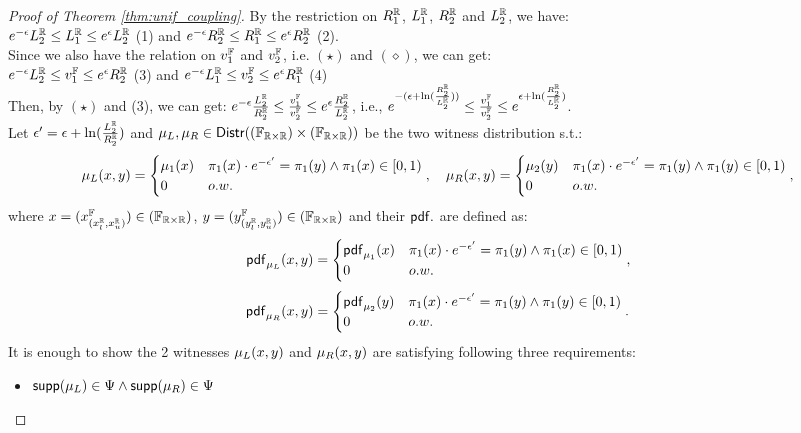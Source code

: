 \documentclass[a4paper,11pt]{article}
\begin{document}
\begin{proof}[Proof of Theorem \ref{thm:unif_coupling}]
%
By the restriction on $R^{\mathbb{R}}_1$, $L^{\mathbb{R}}_1$, $R^{\mathbb{R}}_2$ and $L^{\mathbb{R}}_2$, we have:
\\
$e^{-\epsilon}L^{\mathbb{R}}_2 \leq L^{\mathbb{R}}_1 \leq e^{\epsilon}L^{\mathbb{R}}_2$ (1)
and
$e^{-\epsilon}R^{\mathbb{R}}_2 \leq R^{\mathbb{R}}_1 \leq e^{\epsilon}R^{\mathbb{R}}_2$ (2).
%
\\
Since we also have the relation on $v^{\mathbb{F}}_1$ and $v^{\mathbb{F}}_2$, i.e. $(\star)$ and $(\diamond)$, we can get:
\\
$e^{-\epsilon} L^{\mathbb{R}}_2 \leq v^{\mathbb{F}}_1 \leq e^{\epsilon} R^{\mathbb{R}}_2$ (3)
and
$e^{-\epsilon} L^{\mathbb{R}}_1 \leq v^{\mathbb{F}}_2 \leq e^{\epsilon} R^{\mathbb{R}}_1$ (4)
\\
Then, by $(\star)$ and (3), we can get: 
$e^{-\epsilon} \frac{L^{\mathbb{R}}_2}{R^{\mathbb{R}}_2} 
\leq \frac{v^{\mathbb{F}}_1}{v^{\mathbb{F}}_2} \leq
e^{\epsilon} \frac{R^{\mathbb{R}}_2}{L^{\mathbb{R}}_2} $, i.e., 
$e^{-(\epsilon + \ln(\frac{R^{\mathbb{R}}_2}{L^{\mathbb{R}}_2}))}  
\leq \frac{v^{\mathbb{F}}_1}{v^{\mathbb{F}}_2} \leq
e^{\epsilon + \ln(\frac{R^{\mathbb{R}}_2}{L^{\mathbb{R}}_2})}$.
%
\\
%
Let $\epsilon' = \epsilon + \ln(\frac{L^{\mathbb{R}}_2}{R^{\mathbb{R}}_2})$ and $\mu_L, \mu_R \in \mathsf{Distr}((\mathbb{F}_{\mathbb{R} \times \mathbb{R}}) \times (\mathbb{F}_{\mathbb{R} \times \mathbb{R}}))$ be the two witness distribution s.t.:
\[
	{\mu_L}(x, y) = 
	\begin{cases}
	\mu_1(x)
	& \pi_1(x) \cdot e^{-\epsilon'} = \pi_1(y) \land \pi_1(x) \in [0, 1)\\
	0       & o.w.
	\end{cases},
~~~
	{\mu_R}(x, y) = 
	\begin{cases}
	\mu_2(y)
	& \pi_1(x) \cdot e^{-\epsilon'} = \pi_1(y) \land \pi_1(y) \in [0, 1)\\
	0       & o.w.
	\end{cases},
\]
%
%
where $x = (x^{\mathbb{F}}_{(x^{\mathbb{R}}_l, x^{\mathbb{R}}_u)}) \in (\mathbb{F}_{\mathbb{R} \times \mathbb{R}})$,
$y = (y^{\mathbb{F}}_{(y^{\mathbb{R}}_l, y^{\mathbb{R}}_u)}) \in (\mathbb{F}_{\mathbb{R} \times \mathbb{R}})$ and their $\mathsf{pdf}.$ are defined as:
\[
	\mathsf{pdf}_{\mu_L}(x, y) = 
	\begin{cases}
	\mathsf{pdf}_{\mu_1}(x) & \pi_1(x) \cdot e^{-\epsilon'} = \pi_1(y) \land \pi_1(x) \in [0, 1)\\
	0       & o.w.
	\end{cases},
\]
\[
	\mathsf{pdf}_{\mu_R}(x, y) = 
	\begin{cases}
	\mathsf{pdf}_{\mu_2}(y) & \pi_1(x) \cdot e^{-\epsilon'} = \pi_1(y) \land \pi_1(y) \in [0, 1)\\
	0       & o.w.
	\end{cases}.
\]
It is enough to show the 2 witnesses $\mu_L(x, y)$ and $\mu_R(x, y)$ are satisfying following three requirements:
\begin{itemize}
	\item $\mathsf{supp}(\mu_L) \in \Psi \land \mathsf{supp}(\mu_R) \in \Psi$


\end{itemize}
\end{proof}
\end{document}
